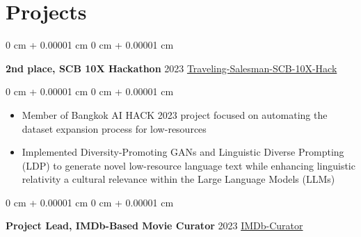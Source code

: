 \documentclass[10pt, letterpaper]{article}
\newenvironment{highlights}{
    \begin{itemize}[
        topsep=0.0 cm,
        parsep=0.0 cm,
        partopsep=0pt,
        itemsep=0pt,
        leftmargin=0 cm + 10pt
    ]
}{
    \end{itemize}
} %
\newenvironment{onecolentry}{
    \begin{adjustwidth}{
        0 cm + 0.00001 cm
    }{
        0 cm + 0.00001 cm
    }
}{
    \end{adjustwidth}
} %
\newenvironment{twocolentrylinkheavy}[2][]{
    \onecolentry
    \def\secondColumn{#2}
    \setcolumnwidth{\fill, 8 cm}
    \begin{paracol}{2}
}{
    \switchcolumn \raggedleft \secondColumn
    \end{paracol}
    \endonecolentry
} %
\newenvironment{twocolentry}[2][]{
    \onecolentry
    \def\secondColumn{#2}
    \setcolumnwidth{\fill, 4.5 cm}
    \begin{paracol}{2}
}{
    \switchcolumn \raggedleft \secondColumn
    \end{paracol}
    \endonecolentry
} %
\begin{document}
        

            

                


    
    \section{Projects}
        \begin{twocolentrylinkheavy}{
            \href{https://github.com/GameTL/Traveling-Salesman-SCB-10X-Hack}{Traveling-Salesman-SCB-10X-Hack}
        }
            \textbf{2nd place, SCB 10X Hackathon} 2023\end{twocolentrylinkheavy}

        \vspace{0.10 cm}
        \begin{onecolentry}
            \begin{highlights}
                \item Member of Bangkok AI HACK 2023 project focused on automating the dataset expansion process for low-resources
                \item Implemented Diversity-Promoting GANs and Linguistic Diverse Prompting (LDP) to generate novel low-resource language text while enhancing linguistic relativity a cultural relevance within the Large Language Models (LLMs)
            \end{highlights}
        \end{onecolentry}

        \vspace{0.30 cm}
        \begin{twocolentrylinkheavy}{
            \href{https://github.com/GameTL/IMDb-Curator?tab=readme-ov-file}{IMDb-Curator}
        }
            \textbf{Project Lead, IMDb-Based Movie Curator} 2023\end{twocolentrylinkheavy}
\end{document}
